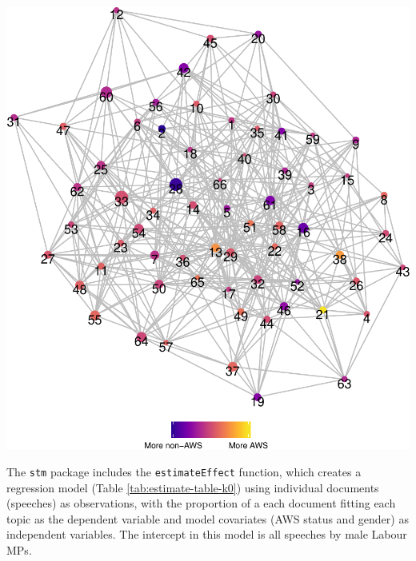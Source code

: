 \documentclass[]{article}
\let\origfigure\figure
\let\endorigfigure\endfigure
\renewenvironment{figure}[1][2] {
    \expandafter\origfigure\expandafter[H]
} {
    \endorigfigure
}
\theoremstyle{definition}
\theoremstyle{definition}
\theoremstyle{definition}
\theoremstyle{remark}
\begin{document}
\begin{table}[H]
\begin{table}[H]
\begin{table}[H]
\begin{table}[H]
\begin{table}[H]
\begin{table}[H]
\begin{table}[H]
\begin{table}[H]
\begin{figure}
\begin{figure}
\centering
\includegraphics{methodology_files/figure-latex/stm-network-graph-1.pdf}
\caption{\label{fig:stm-network-graph}Fruchterman-Reingold plot of Topic
Network}
\end{figure}

The \texttt{stm} package includes the \texttt{estimateEffect} function,
which creates a regression model (Table \ref{tab:estimate-table-k0})
using individual documents (speeches) as observations, with the
proportion of a each document fitting each topic as the dependent
variable and model covariates (AWS status and gender) as independent
variables. The intercept in this model is all speeches by male Labour
MPs.


\end{figure}
\end{table}
\end{table}
\end{table}
\end{table}
\end{table}
\end{table}
\end{table}
\end{table}
\end{document}
